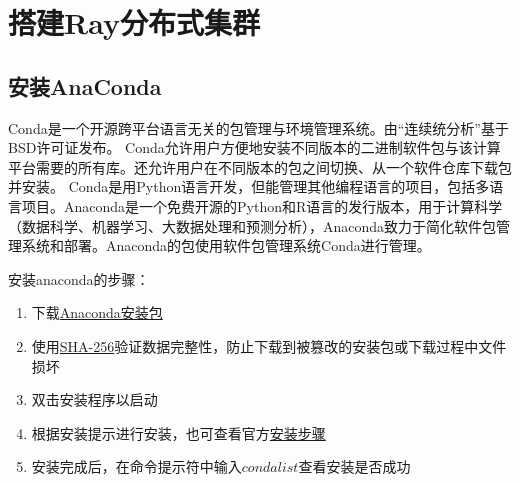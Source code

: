\section{搭建Ray分布式集群}

\subsection{安装AnaConda}
Conda是一个开源跨平台语言无关的包管理与环境管理系统。由“连续统分析”基于BSD许可证发布。 Conda允许用户方便地安装不同版本的二进制软件包与该计算平台需要的所有库。还允许用户在不同版本的包之间切换、从一个软件仓库下载包并安装。 Conda是用Python语言开发，但能管理其他编程语言的项目，包括多语言项目。Anaconda是一个免费开源的Python和R语言的发行版本，用于计算科学（数据科学、机器学习、大数据处理和预测分析），Anaconda致力于简化软件包管理系统和部署。Anaconda的包使用软件包管理系统Conda进行管理。

安装anaconda的步骤：
\begin{enumerate}
    \item 下载\href{https://www.anaconda.com/download/#windows}{Anaconda安装包}
    \item 使用\href{https://docs.anaconda.com/anaconda/install/hashes/}{SHA-256}验证数据完整性，防止下载到被篡改的安装包或下载过程中文件损坏
    \item 双击安装程序以启动
    \item 根据安装提示进行安装，也可查看官方\href{https://docs.anaconda.com/anaconda/install/windows/}{安装步骤}
    \item 安装完成后，在命令提示符中输入$ conda list $查看安装是否成功
\end{enumerate}

